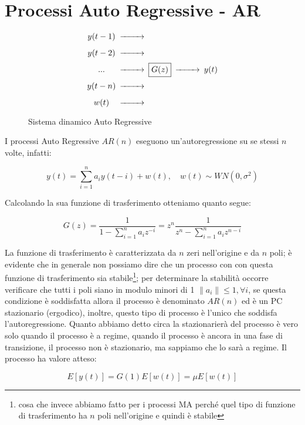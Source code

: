 \section{Processi Auto Regressive - AR}

\begin{figure}[htbp]\Large
  \centering
  \[
    \begin{CD}
      \begin{CD}
        y(t-1) @>>>\\
        y(t-2) @>>>\\
          ...  @>>>\\
        y(t-n) @>>>\\
        w(t)   @>>>
      \end{CD}
      \framebox{$G(z)$} @>>> y(t)
    \end{CD}
  \]
  \caption{Sistema dinamico Auto Regressive \label{fig:ar}}
\end{figure}

I processi Auto Regressive $AR(n)$ eseguono un'autoregressione su se stessi $n$ volte, infatti:

  \[ y(t)=\sum_{i=1}^{n}{a_iy(t-i)}+w(t), \quad w(t)\sim WN(0,\sigma^2) \]
  
Calcolando la sua funzione di trasferimento otteniamo quanto segue:

  \[ G(z)=\frac{1}{1-\sum_{i=1}^{n}{a_iz^{-i}}}=z^n\frac{1}{z^n-\sum_{i=1}^{n}{a_iz^{n-i}}} \]
  
La funzione di trasferimento è caratterizzata da $n$ zeri nell'origine e da $n$ poli; è evidente che in generale non possiamo dire che un processo con con questa funzione di trasferimento sia stabile\footnote{cosa che invece abbiamo fatto per i processi MA perché quel tipo di funzione di trasferimento ha $n$ poli nell'origine e quindi è stabile}; per determinare la stabilità occorre verificare che tutti i poli siano in modulo minori di 1 $\|a_i\|\leq 1, \forall i$, se questa condizione è soddisfatta allora il processo è denominato $AR(n)$ ed è un PC stazionario (ergodico), inoltre, questo tipo di processo è l'unico che soddisfa l'autoregressione. Quanto abbiamo detto circa la stazionarierà del processo è vero solo quando il processo è a regime, quando il processo è ancora in una fase di transizione, il processo non è stazionario, ma sappiamo che lo sarà a regime.\newline
Il processo ha valore atteso:

  \[ E[y(t)]=G(1)E[w(t)]=\mu E[w(t)] \]
  
